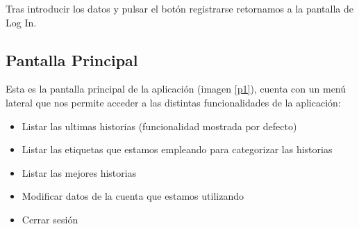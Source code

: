 \documentclass[11pt,a4paper, titlepage]{article}
\begin{document}
Tras introducir los datos y pulsar el botón registrarse retornamos a la pantalla de Log In.
	
	\FloatBarrier
	
	\newpage
	\subsection[Pantalla Principal]{Pantalla Principal}
	\label{inPrin}
	
	Esta es la pantalla principal de la aplicación (imagen \ref{p1}), cuenta con un menú lateral que nos permite acceder a las distintas funcionalidades de la aplicación:
	
	\begin{itemize}
		\item Listar las ultimas historias (funcionalidad mostrada por defecto)
		\item Listar las etiquetas que estamos empleando para categorizar las historias
		\item Listar las mejores historias
		\item Modificar datos de la cuenta que estamos utilizando
		\item Cerrar sesión
	\end{itemize}
	
\end{document}
